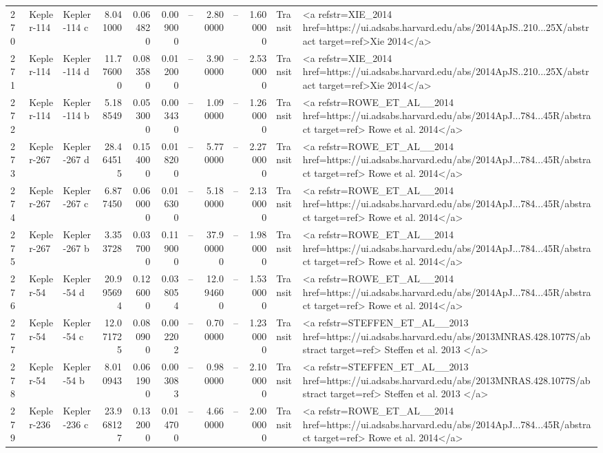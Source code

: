 \begin{tabular}{lllrrrrrrrll}
270 & Kepler-114 & Kepler-114 c & 8.041000 & 0.064820 & 0.009000 & -- & 2.800000 & -- & 1.600000 & Transit & <a refstr=XIE_2014 href=https://ui.adsabs.harvard.edu/abs/2014ApJS..210...25X/abstract target=ref>Xie 2014</a> \\
271 & Kepler-114 & Kepler-114 d & 11.776000 & 0.083580 & 0.012000 & -- & 3.900000 & -- & 2.530000 & Transit & <a refstr=XIE_2014 href=https://ui.adsabs.harvard.edu/abs/2014ApJS..210...25X/abstract target=ref>Xie 2014</a> \\
272 & Kepler-114 & Kepler-114 b & 5.188549 & 0.053000 & 0.003430 & -- & 1.090000 & -- & 1.260000 & Transit & <a refstr=ROWE_ET_AL__2014 href=https://ui.adsabs.harvard.edu/abs/2014ApJ...784...45R/abstract target=ref> Rowe et al. 2014</a> \\
273 & Kepler-267 & Kepler-267 d & 28.464515 & 0.154000 & 0.018200 & -- & 5.770000 & -- & 2.270000 & Transit & <a refstr=ROWE_ET_AL__2014 href=https://ui.adsabs.harvard.edu/abs/2014ApJ...784...45R/abstract target=ref> Rowe et al. 2014</a> \\
274 & Kepler-267 & Kepler-267 c & 6.877450 & 0.060000 & 0.016300 & -- & 5.180000 & -- & 2.130000 & Transit & <a refstr=ROWE_ET_AL__2014 href=https://ui.adsabs.harvard.edu/abs/2014ApJ...784...45R/abstract target=ref> Rowe et al. 2014</a> \\
275 & Kepler-267 & Kepler-267 b & 3.353728 & 0.037000 & 0.119000 & -- & 37.900000 & -- & 1.980000 & Transit & <a refstr=ROWE_ET_AL__2014 href=https://ui.adsabs.harvard.edu/abs/2014ApJ...784...45R/abstract target=ref> Rowe et al. 2014</a> \\
276 & Kepler-54 & Kepler-54 d & 20.995694 & 0.126000 & 0.038054 & -- & 12.094600 & -- & 1.530000 & Transit & <a refstr=ROWE_ET_AL__2014 href=https://ui.adsabs.harvard.edu/abs/2014ApJ...784...45R/abstract target=ref> Rowe et al. 2014</a> \\
277 & Kepler-54 & Kepler-54 c & 12.071725 & 0.080900 & 0.002202 & -- & 0.700000 & -- & 1.230000 & Transit & <a refstr=STEFFEN_ET_AL__2013 href=https://ui.adsabs.harvard.edu/abs/2013MNRAS.428.1077S/abstract target=ref> Steffen et al. 2013 </a> \\
278 & Kepler-54 & Kepler-54 b & 8.010943 & 0.061900 & 0.003083 & -- & 0.980000 & -- & 2.100000 & Transit & <a refstr=STEFFEN_ET_AL__2013 href=https://ui.adsabs.harvard.edu/abs/2013MNRAS.428.1077S/abstract target=ref> Steffen et al. 2013 </a> \\
279 & Kepler-236 & Kepler-236 c & 23.968127 & 0.132000 & 0.014700 & -- & 4.660000 & -- & 2.000000 & Transit & <a refstr=ROWE_ET_AL__2014 href=https://ui.adsabs.harvard.edu/abs/2014ApJ...784...45R/abstract target=ref> Rowe et al. 2014</a> \\

\end{tabular}
